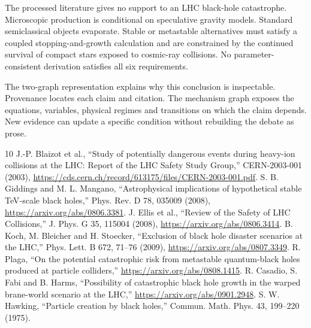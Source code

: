 \documentclass[10pt]{article}
\begin{document}
The processed literature gives no support to an LHC black-hole catastrophe. Microscopic production is conditional on speculative gravity models. Standard semiclassical objects evaporate. Stable or metastable alternatives must satisfy a coupled stopping-and-growth calculation and are constrained by the continued survival of compact stars exposed to cosmic-ray collisions. No parameter-consistent derivation satisfies all six requirements.

The two-graph representation explains why this conclusion is inspectable. Provenance locates each claim and citation. The mechanism graph exposes the equations, variables, physical regimes and transitions on which the claim depends. New evidence can update a specific condition without rebuilding the debate as prose.

\FloatBarrier

\begin{thebibliography}{10}
 J.-P. Blaizot et al., ``Study of potentially dangerous events during heavy-ion collisions at the LHC: Report of the LHC Safety Study Group,'' CERN-2003-001 (2003), \url{https://cds.cern.ch/record/613175/files/CERN-2003-001.pdf}.
 S. B. Giddings and M. L. Mangano, ``Astrophysical implications of hypothetical stable TeV-scale black holes,'' Phys. Rev. D 78, 035009 (2008), \url{https://arxiv.org/abs/0806.3381}.
 J. Ellis et al., ``Review of the Safety of LHC Collisions,'' J. Phys. G 35, 115004 (2008), \url{https://arxiv.org/abs/0806.3414}.
 B. Koch, M. Bleicher and H. Stoecker, ``Exclusion of black hole disaster scenarios at the LHC,'' Phys. Lett. B 672, 71--76 (2009), \url{https://arxiv.org/abs/0807.3349}.
 R. Plaga, ``On the potential catastrophic risk from metastable quantum-black holes produced at particle colliders,'' \url{https://arxiv.org/abs/0808.1415}.
 R. Casadio, S. Fabi and B. Harms, ``Possibility of catastrophic black hole growth in the warped brane-world scenario at the LHC,'' \url{https://arxiv.org/abs/0901.2948}.
 S. W. Hawking, ``Particle creation by black holes,'' Commun. Math. Phys. 43, 199--220 (1975).
\end{thebibliography}
\end{document}
